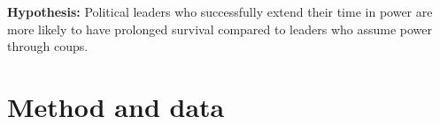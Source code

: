 \documentclass[
  12pt,
  a4paper,
  12pt]{article}
\begin{document}
\textbf{Hypothesis:} Political leaders who successfully extend their
time in power are more likely to have prolonged survival compared to
leaders who assume power through coups.

\hypertarget{method-and-data}{%
\section{Method and data}\label{method-and-data}}

\newpage


\renewcommand\refname{References}
  
\end{document}

